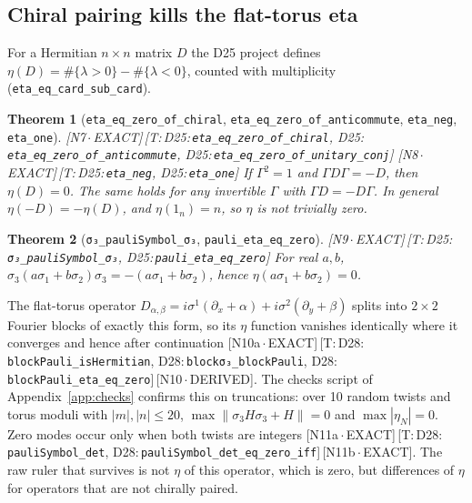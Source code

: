 \documentclass[11pt]{article}
\newtheorem{theorem}{Theorem}
\theoremstyle{definition}
\newcommand{\lean}[1]{\texttt{\small #1}}
\newcommand{\dtag}[1]{#1}
\begin{document}
\subsection{Chiral pairing kills the flat-torus eta}
For a Hermitian $n\times n$ matrix $D$ the D25 project defines $\eta(D)=\#\{\lambda>0\}-\#\{\lambda<0\}$, counted with multiplicity (\lean{eta\_eq\_card\_sub\_card}).
\begin{theorem}[\lean{eta\_eq\_zero\_of\_chiral}, \lean{eta\_eq\_zero\_of\_anticommute}, \lean{eta\_neg}, \lean{eta\_one}]\dtag{\textsf{\small[N7\,$\cdot$\,EXACT]}\,\textsf{\small[T:\,D25:\,\lean{eta\_\allowbreak{}eq\_\allowbreak{}zero\_\allowbreak{}of\_\allowbreak{}chiral}, D25:\,\lean{eta\_\allowbreak{}eq\_\allowbreak{}zero\_\allowbreak{}of\_\allowbreak{}anticommute}, D25:\,\lean{eta\_\allowbreak{}eq\_\allowbreak{}zero\_\allowbreak{}of\_\allowbreak{}unitary\_\allowbreak{}conj}]} \textsf{\small[N8\,$\cdot$\,EXACT]}\,\textsf{\small[T:\,D25:\,\lean{eta\_\allowbreak{}neg}, D25:\,\lean{eta\_\allowbreak{}one}]}}
If $\Gamma^2=1$ and $\Gamma D\Gamma=-D$, then $\eta(D)=0$. The same holds for any invertible $\Gamma$ with $\Gamma D=-D\Gamma$. In general $\eta(-D)=-\eta(D)$, and $\eta(1_n)=n$, so $\eta$ is not trivially zero.
\end{theorem}
\begin{theorem}[\lean{σ₃\_pauliSymbol\_σ₃}, \lean{pauli\_eta\_eq\_zero}]\dtag{\textsf{\small[N9\,$\cdot$\,EXACT]}\,\textsf{\small[T:\,D25:\,\lean{σ₃\_\allowbreak{}pauliSymbol\_\allowbreak{}σ₃}, D25:\,\lean{pauli\_\allowbreak{}eta\_\allowbreak{}eq\_\allowbreak{}zero}]}}
For real $a,b$, $\sigma_3(a\sigma_1+b\sigma_2)\sigma_3=-(a\sigma_1+b\sigma_2)$, hence $\eta(a\sigma_1+b\sigma_2)=0$.
\end{theorem}
The flat-torus operator $D_{\alpha,\beta}=i\sigma^1(\partial_x+\alpha)+i\sigma^2(\partial_y+\beta)$ splits into $2\times2$ Fourier blocks of exactly this form, so its $\eta$ function vanishes identically where it converges and hence after continuation \dtag{\textsf{\small[N10a\,$\cdot$\,EXACT]}\,\textsf{\small[T:\,D28:\,\lean{blockPauli\_\allowbreak{}isHermitian}, D28:\,\lean{blockσ₃\_\allowbreak{}blockPauli}, D28:\,\lean{blockPauli\_\allowbreak{}eta\_\allowbreak{}eq\_\allowbreak{}zero}]}\,\textsf{\small[N10\,$\cdot$\,DERIVED]}}. The checks script of Appendix~\ref{app:checks} confirms this on truncations: over 10 random twists and torus moduli with $|m|,|n|\le20$, $\max\|\sigma_3H\sigma_3+H\|=0$ and $\max|\eta_N|=0$. Zero modes occur only when both twists are integers \dtag{\textsf{\small[N11a\,$\cdot$\,EXACT]}\,\textsf{\small[T:\,D28:\,\lean{pauliSymbol\_\allowbreak{}det}, D28:\,\lean{pauliSymbol\_\allowbreak{}det\_\allowbreak{}eq\_\allowbreak{}zero\_\allowbreak{}iff}]}\,\textsf{\small[N11b\,$\cdot$\,EXACT]}}. The raw ruler that survives is not $\eta$ of this operator, which is zero, but differences of $\eta$ for operators that are not chirally paired.
\end{document}
